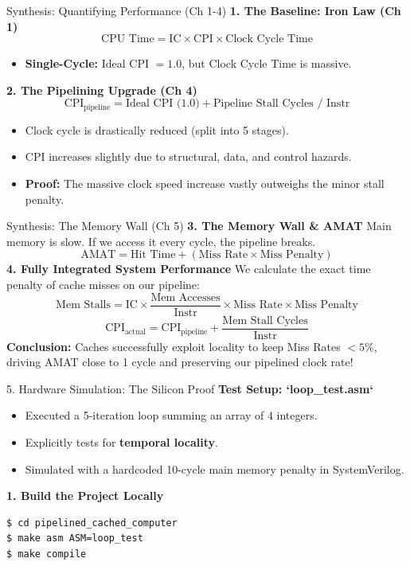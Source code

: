 \documentclass[aspectratio=169]{beamer}
\begin{document}
\begin{frame}{Synthesis: Quantifying Performance (Ch 1-4)}
\textbf{1. The Baseline: Iron Law (Ch 1)}
\[ \text{CPU Time} = \text{IC} \times \text{CPI} \times \text{Clock Cycle Time} \]
\begin{itemize}
    \item \textbf{Single-Cycle:} Ideal CPI $= 1.0$, but Clock Cycle Time is massive.
\end{itemize}
\vspace{0.3cm}
\textbf{2. The Pipelining Upgrade (Ch 4)}
\[ \text{CPI}_{\text{pipeline}} = \text{Ideal CPI (1.0)} + \text{Pipeline Stall Cycles / Instr} \]
\begin{itemize}
    \item Clock cycle is drastically reduced (split into 5 stages).
    \item CPI increases slightly due to structural, data, and control hazards.
    \item \textbf{Proof:} The massive clock speed increase vastly outweighs the minor stall penalty.
\end{itemize}
\end{frame}

\begin{frame}{Synthesis: The Memory Wall (Ch 5)}
\textbf{3. The Memory Wall \& AMAT}
Main memory is slow. If we access it every cycle, the pipeline breaks.
\[ \text{AMAT} = \text{Hit Time} + (\text{Miss Rate} \times \text{Miss Penalty}) \]
\vspace{0.3cm}
\textbf{4. Fully Integrated System Performance}
We calculate the exact time penalty of cache misses on our pipeline:
\[ \text{Mem Stalls} = \text{IC} \times \frac{\text{Mem Accesses}}{\text{Instr}} \times \text{Miss Rate} \times \text{Miss Penalty} \]
\[ \text{CPI}_{\text{actual}} = \text{CPI}_{\text{pipeline}} + \frac{\text{Mem Stall Cycles}}{\text{Instr}} \]
\textbf{Conclusion:} Caches successfully exploit locality to keep Miss Rates $<5\%$, driving AMAT close to 1 cycle and preserving our pipelined clock rate!
\end{frame}

\begin{frame}[fragile]{5. Hardware Simulation: The Silicon Proof}
\textbf{Test Setup: `loop\_test.asm`}
\begin{itemize}
    \item Executed a 5-iteration loop summing an array of 4 integers.
    \item Explicitly tests for \textbf{temporal locality}.
    \item Simulated with a hardcoded 10-cycle main memory penalty in SystemVerilog.
\end{itemize}
\vspace{0.2cm}

\textbf{1. Build the Project Locally}
\begin{verbatim}
$ cd pipelined_cached_computer
$ make asm ASM=loop_test
$ make compile
\end{verbatim}
\end{frame}
\end{document}
